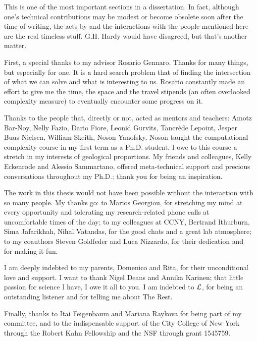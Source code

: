 %
%


This is one of the most important sections in a dissertation. In fact, although one's technical contributions may be modest or become obsolete soon after the time of writing, the acts by and the interactions with the people mentioned here are the real timeless stuff. G.H. Hardy would have disagreed, but that's another matter.

First, a special thanks to my advisor Rosario Gennaro. Thanks for many things, but especially for one. It is a hard search problem that of finding the intersection of what we can solve and what is interesting to us. Rosario constantly made an effort to give me the time,  the space and the travel stipends (an often overlooked complexity measure) to eventually encounter some progress on it. 

Thanks to the people that, directly or not, acted as mentors and teachers: Amotz Bar-Noy, Nelly Fazio, Dario Fiore, Leonid Gurvits, Tancr\`ede Lepoint, Jesper Buus Nielsen, William Skeith, Noson Yanofsky. Noson taught the computational complexity course in my first term as a Ph.D. student. I owe to this course a stretch in my interests of geological proportions. My friends and colleagues, Kelly Eckenrode and Alessio Sammartano, offered meta-technical support and precious conversations throughout my Ph.D.; thank you for being an inspiration.

The work in this thesis would not have been possible without the interaction with so many people. My thanks go: to Marios Georgiou, for stretching my mind at every opportunity and tolerating my research-related phone calls at uncomfortable times of the day;
to my colleagues at CCNY, Bertrand Ithurburn, Sima Jafarikhah, Nihal Vatandas, for the good chats and a great lab atmosphere; 
to my coauthors Steven Goldfeder and Luca Nizzardo, for their dedication and for making it fun. 

I am deeply indebted to my parents, Domenico and Rita, for their unconditional love and support. I want to thank Nigel Deans and Annika Karinen; that little passion for science I have, I owe it all to you. I am indebted to $\cal{L}$, for being an outstanding listener and for telling me about The Rest. 

Finally, thanks to Itai Feigenbaum and Mariana Raykova for being part of my committee, and to the indispensable support of the City College of New York through the Robert Kahn Fellowship and the NSF through grant 1545759.

\restoregeometry



